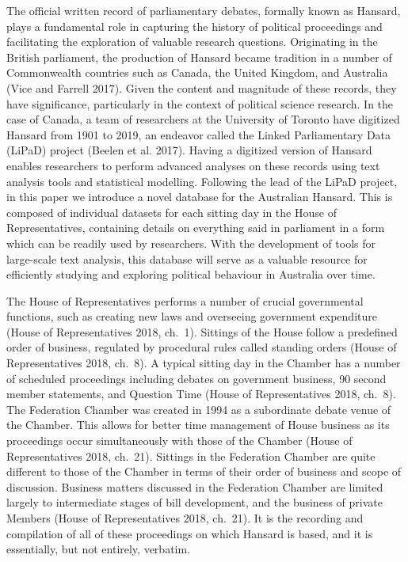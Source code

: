 \documentclass[
  letterpaper,
  DIV=11,
  numbers=noendperiod]{scrartcl}
\begin{document}
The official written record of parliamentary debates, formally known as
Hansard, plays a fundamental role in capturing the history of political
proceedings and facilitating the exploration of valuable research
questions. Originating in the British parliament, the production of
Hansard became tradition in a number of Commonwealth countries such as
Canada, the United Kingdom, and Australia (Vice and Farrell 2017). Given
the content and magnitude of these records, they have significance,
particularly in the context of political science research. In the case
of Canada, a team of researchers at the University of Toronto have
digitized Hansard from 1901 to 2019, an endeavor called the Linked
Parliamentary Data (LiPaD) project (Beelen et al. 2017). Having a
digitized version of Hansard enables researchers to perform advanced
analyses on these records using text analysis tools and statistical
modelling. Following the lead of the LiPaD project, in this paper we
introduce a novel database for the Australian Hansard. This is composed
of individual datasets for each sitting day in the House of
Representatives, containing details on everything said in parliament in
a form which can be readily used by researchers. With the development of
tools for large-scale text analysis, this database will serve as a
valuable resource for efficiently studying and exploring political
behaviour in Australia over time.

The House of Representatives performs a number of crucial governmental
functions, such as creating new laws and overseeing government
expenditure (House of Representatives 2018, ch.~1). Sittings of the
House follow a predefined order of business, regulated by procedural
rules called standing orders (House of Representatives 2018, ch.~8). A
typical sitting day in the Chamber has a number of scheduled proceedings
including debates on government business, 90 second member statements,
and Question Time (House of Representatives 2018, ch.~8). The Federation
Chamber was created in 1994 as a subordinate debate venue of the
Chamber. This allows for better time management of House business as its
proceedings occur simultaneously with those of the Chamber (House of
Representatives 2018, ch.~21). Sittings in the Federation Chamber are
quite different to those of the Chamber in terms of their order of
business and scope of discussion. Business matters discussed in the
Federation Chamber are limited largely to intermediate stages of bill
development, and the business of private Members (House of
Representatives 2018, ch.~21). It is the recording and compilation of
all of these proceedings on which Hansard is based, and it is
essentially, but not entirely, verbatim.
\end{document}
